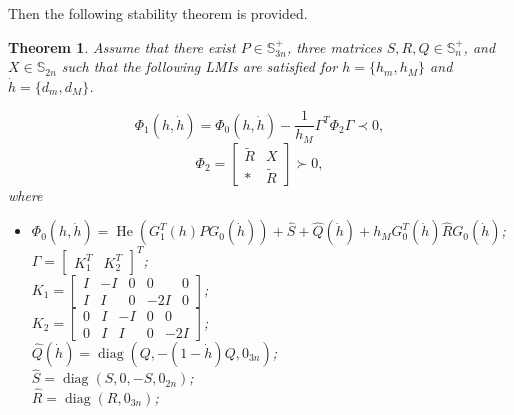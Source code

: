 \documentclass[a4paper]{cas-sc}
\newtheorem{theorem}{Theorem}
\begin{document}
Then the following stability theorem is provided.
\begin{theorem}
  \label{theorem6}
  Assume that there exist $ P \in \mathbb{S}_{3n}^ +  $, three matrices $ S,R,Q \in \mathbb{S}_n^ +  $, and $ X \in \mathbb{S}{_{2n}} $ such that the following LMIs are satisfied for $ h = \{ {h_m},{h_M}\}  $ and $ \dot h = \{ {d_m},{d_M}\}  $.

  \begin{equation}
    \label{eq25}
    {\Phi _1}(h,\dot h) = {\Phi _0}(h,\dot h) - \frac{1}{{{h_M}}}{\Gamma ^T}{\Phi _2}\Gamma  \prec 0,
  \end{equation}
  \begin{equation}
    \label{eq26}
    {\Phi _2} = \left[ {\begin{array}{*{20}{c}}
            {\tilde R} & X          \\
            *          & {\tilde R}
          \end{array}} \right] \succ 0,
  \end{equation}
  where
  \begin{itemize}
    \item[]
      $ {\Phi _0}(h,\dot h) = \operatorname{He} \left( {G_1^T(h)P{G_0}(\dot h)} \right) + \hat S + \hat Q(\dot h) + {h_M}G_0^T(\dot h)\hat R{G_0}(\dot h) $;                     \\
      $ \Gamma  = {\left[ {\begin{array}{*{20}{c}}
                {K_1^T} & {K_2^T}
              \end{array}} \right]^T} $;\\
      $ {K_1} = \left[ {\begin{array}{*{20}{c}}
                I & { - I} & 0 & 0       & 0 \\
                I & I      & 0 & { - 2I} & 0
              \end{array}} \right] $;\\
      $ {K_2} = \left[ {\begin{array}{*{20}{c}}
                0 & I & { - I} & 0 & 0       \\
                0 & I & I      & 0 & { - 2I}
              \end{array}} \right] $;\\
      $ \hat Q(\dot h) = \operatorname{diag} \left( {Q, - (1 - \dot h)Q,{0_{3n}}} \right) $;\\
      $ \hat S = \operatorname{diag} \left( {S,0, - S,{0_{2n}}} \right) $;\\
      $ \hat R = \operatorname{diag} \left( {R,{0_{3n}}} \right) $;\\

\end{itemize}
\end{theorem}
\end{document}
